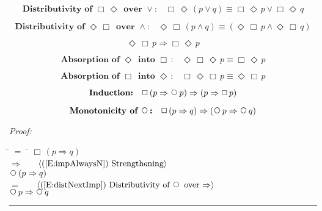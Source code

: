 \documentclass[fleqn, leqno]{article}
\newcommand{\lgap}{2pt} %
\newcommand{\mymathindent}{24pt} %
\newcommand{\Next}{\;\,\text{\raisebox{3.5pt}{\circle{6}}}}
\newcommand{\Event}{\Diamond\,}
\newcommand{\Always}{\Box\,}
\newcommand{\myqed}{\hfill\rule[-.23ex]{1.2ex}{2.0ex}}
\newcommand{\Gll} {\langle} %
\newcommand{\Ggg} {\rangle} %
\newcommand{\Hint}[1] {\ \ \ $\Gll \mbox{#1} \Ggg$ } %
\begin{document}
\begin{equation}\label{E:distAlwaysEventOr}
\textbf{Distributivity of $\Always\Event$ over $\lor$:}\quad \Always\Event(p \lor q) \equiv \Always\Event p \lor \Always\Event q
\end{equation}


\begin{equation}\label{E:distEventAlwaysAnd}
\textbf{Distributivity of $\Event\Always$ over $\land$:}\quad \Event\Always(p \land q) \equiv (\Event\Always p \land \Event\Always q)
\end{equation}


\begin{equation}\label{E:eventAlwaysImp}
\Event\Always p \Rightarrow \Always\Event p
\end{equation}



\begin{equation}\label{E:absEvent}
\textbf{Absorption of $\Event$ into $\Always$:}\quad \Event\Always\Event p \equiv \Always\Event p
\end{equation}



\begin{equation}\label{E:absAlways}
\textbf{Absorption of $\Always$ into $\Event$:}\quad \Always\Event\Always p \equiv \Event\Always p
\end{equation}



\begin{equation}\label{E:induction}
\textbf{Induction:}\quad \Always (p \Rightarrow \Next p) \Rightarrow (p \Rightarrow \Always p)
\end{equation}



\begin{equation}\label{E:alwaysImpNexts}
\textbf{Monotonicity of $\Next$:}\quad \Always (p \Rightarrow q) \Rightarrow (\Next p \Rightarrow \Next q)
\end{equation}

\emph{Proof:}
\begin{tabbing}
\hspace{\mymathindent} \= $= \;$ \= \kill
\> \> $\Always (p \Rightarrow q)$\\[\lgap]
\> $\Rightarrow$ \> \Hint{(\ref{E:impAlwaysN}) Strengthening}\\[\lgap]
\> \> $\Next (p \Rightarrow q)$\\[\lgap]
\> $=$ \> \Hint{(\ref{E:distNextImp}) Distributivity of $\Next$ over $\Rightarrow$}\\[\lgap]
\> \> $\Next p \Rightarrow \Next q$\\[\lgap]
\end{tabbing}
\myqed\\[\lgap]
\end{document}
